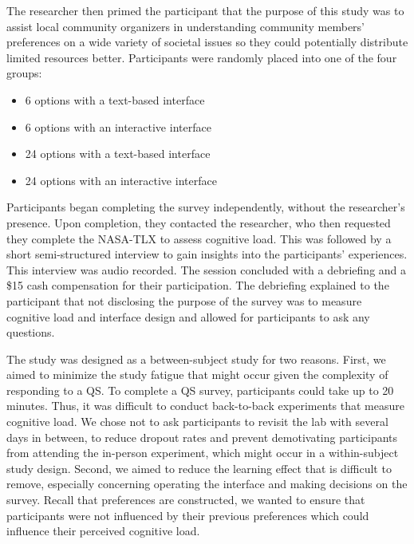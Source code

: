 The researcher then primed the participant that the purpose of this study was to assist local community organizers in understanding community members' preferences on a wide variety of societal issues so they could potentially distribute limited resources better. Participants were randomly placed into one of the four groups:

\begin{itemize}
    \item 6 options with a text-based interface
    \item 6 options with an interactive interface
    \item 24 options with a text-based interface
    \item 24 options with an interactive interface
\end{itemize}

Participants began completing the survey independently, without the researcher's presence. Upon completion, they contacted the researcher, who then requested they complete the NASA-TLX to assess cognitive load. This was followed by a short semi-structured interview to gain insights into the participants' experiences. This interview was audio recorded. The session concluded with a debriefing and a \$15 cash compensation for their participation. The debriefing explained to the participant that not disclosing the purpose of the survey was to measure cognitive load and interface design and allowed for participants to ask any questions.


The study was designed as a between-subject study for two reasons. First, we aimed to minimize the study fatigue that might occur given the complexity of responding to a QS. To complete a QS survey, participants could take up to 20 minutes. Thus, it was difficult to conduct back-to-back experiments that measure cognitive load. We chose not to ask participants to revisit the lab with several days in between, to reduce dropout rates and prevent demotivating participants from attending the in-person experiment, which might occur in a within-subject study design. Second, we aimed to reduce the learning effect that is difficult to remove, especially concerning operating the interface and making decisions on the survey. Recall that preferences are constructed, we wanted to ensure that participants were not influenced by their previous preferences which could influence their perceived cognitive load.

